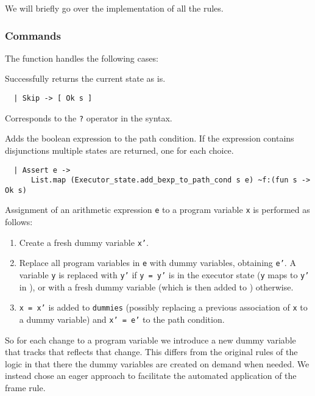 \documentclass[parskip=half]{scrartcl}
\begin{document}
We will briefly go over the implementation of all the rules.

\subsubsection{Commands}

The  function handles the following cases:


Successfully returns the current state as is.

\begin{verbatim}
  | Skip -> [ Ok s ]
\end{verbatim}


Corresponds to the \texttt{?} operator in the syntax.

Adds the boolean expression to the path condition. If the expression contains disjunctions multiple states are returned, one for each choice.

\begin{verbatim}
  | Assert e ->
      List.map (Executor_state.add_bexp_to_path_cond s e) ~f:(fun s -> Ok s)
\end{verbatim}


Assignment of an arithmetic expression \texttt{e} to a program variable \texttt{x} is performed as follows:
\begin{enumerate}
\item Create a fresh dummy variable \texttt{x'}.
\item Replace all program variables in \texttt{e} with dummy variables, obtaining \texttt{e'}. A variable \texttt{y} is replaced with \texttt{y'} if \texttt{y = y'} is in the executor state (\ie \texttt{y} maps to \texttt{y'} in ), or with a fresh dummy variable (which is then added to ) otherwise.
\item \texttt{x = x'} is added to \texttt{dummies} (possibly replacing a previous association of \texttt{x} to a dummy variable) and \texttt{x' = e'} to the path condition.
\end{enumerate}

So for each change to a program variable we introduce a new dummy variable that tracks that reflects that change. This differs from the original rules of the logic in that there the dummy variables are created on demand when needed. We instead chose an eager approach to facilitate the automated application of the frame rule.
\end{document}
